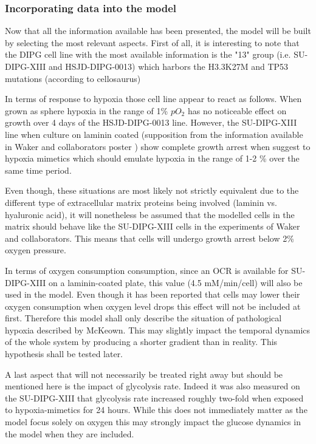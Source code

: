 \documentclass[11pt,a4paper]{article}
\begin{document}
\subsubsection{Incorporating data into the model}
Now that all the information available has been presented, the model will be built by selecting the most relevant aspects. First of all, it is interesting to note that the DIPG cell line with the most available information is the "13" group (i.e. SU-DIPG-XIII and HSJD-DIPG-0013) which harbors the H3.3K27M and TP53 mutations (according to cellosaurus) 

In terms of response to hypoxia those cell line appear  to react as follows. When grown as sphere hypoxia in the range of 1\% $pO_2$ has no noticeable effect on growth over 4 days of the HSJD-DIPG-0013 line. However, the SU-DIPG-XIII line when culture on laminin coated (supposition from the information available in Waker and collaborators poster \cite{Waker2018}) show complete growth arrest when suggest to hypoxia mimetics which should emulate hypoxia in the range of 1-2 \% over the same time period. 

Even though, these situations are most likely not strictly equivalent due to the different type of extracellular matrix proteins being involved (laminin vs. hyaluronic acid), it will nonetheless be assumed that the modelled cells in the matrix should behave like the SU-DIPG-XIII cells in the experiments of Waker and collaborators. This means that cells will undergo growth arrest  below 2\% oxygen pressure.

In terms of oxygen consumption consumption, since an OCR is available for SU-DIPG-XIII on a laminin-coated plate, this value (4.5 mM/min/cell) will also be used in the model. Even though it has been reported that cells may lower their oxygen consumption when oxygen level drops this effect will not be included at first. Therefore this model shall only describe the situation of pathological hypoxia described by McKeown. This may slightly impact the temporal dynamics of the whole system by producing a shorter gradient than in reality. This hypothesis shall be tested later.

A last aspect that will not necessarily be treated right away but should be mentioned here is the impact of glycolysis rate. Indeed it was also measured  on the SU-DIPG-XIII that glycolysis rate increased roughly two-fold when exposed to hypoxia-mimetics for 24 hours. While this does not immediately matter as the model focus solely on oxygen this may strongly impact the glucose dynamics in the model when they are included.
\end{document}
